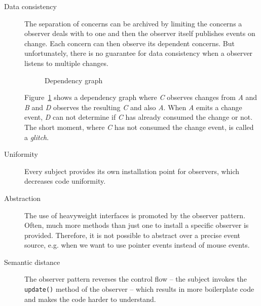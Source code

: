 \documentclass[acmsmall]{acmart}\settopmatter{printfolios=true,printccs=false,printacmref=false}
\begin{document}
\begin{description}
			\item[Data consistency]
			The separation of concerns can be archived by limiting the concerns a observer deals with to one and then the observer itself publishes events on change.
			Each concern can then observe its dependent concerns.
			But unfortunately, there is no guarantee for data consistency when a observer listens to multiple changes. 
			\begin{figure}[H]
				\caption{Dependency graph}
				\label{fig:glitchgraph}
			\end{figure}
			Figure~\ref{fig:glitchgraph} shows a dependency graph where \textit{C} observes changes from \textit{A} and \textit{B} and \textit{D} observes the resulting \textit{C} and also \textit{A}.
			When \textit{A} emits a change event, \textit{D} can not determine if \textit{C} has already consumed the change or not. 
			The short moment, where \textit{C} has not consumed the change event, is called a \textit{glitch}.
			\item[Uniformity]
			Every subject provides its own installation point for observers, which decreases code uniformity.
			\item[Abstraction]
			The use of heavyweight interfaces is promoted by the observer pattern. 
			Often, much more methods than just one to install a specific observer is provided. 
			Therefore, it is not possible to abstract over a precise event source, e.g. when we want to use pointer events instead of mouse events.
			\item[Semantic distance]
			The observer pattern reverses the control flow -- the subject invokes the \lstinline|update()| method of the observer -- which results in more boilerplate code and makes the code harder to understand.
		\end{description}
\end{document}
